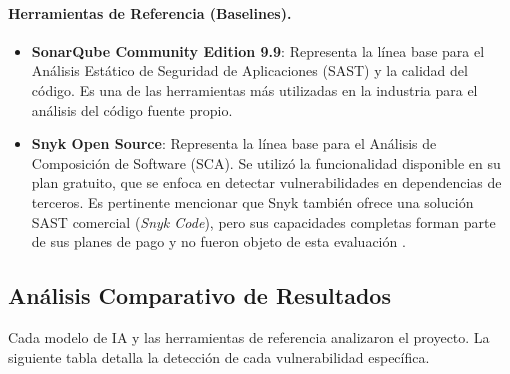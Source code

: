 \paragraph{Herramientas de Referencia (Baselines).}
\begin{itemize}
\item \textbf{SonarQube Community Edition 9.9}: Representa la línea base para el Análisis Estático de Seguridad de
Aplicaciones (SAST) y la calidad del código. Es una de las herramientas más utilizadas en la industria para el análisis del código fuente propio.
\item \textbf{Snyk Open Source}: Representa la línea base para el Análisis de Composición de Software (SCA). Se utilizó la funcionalidad disponible en su plan gratuito, que se enfoca en detectar vulnerabilidades en dependencias de terceros. Es pertinente mencionar que Snyk también ofrece una solución SAST comercial (\textit{Snyk Code}), pero sus capacidades completas forman parte de sus planes de pago y no fueron objeto de esta evaluación \cite{snyk_plans}.
\end{itemize}

\subsection{Análisis Comparativo de Resultados}
\label{subsec:analisis_comparativo_resultados}
Cada modelo de IA y las herramientas de referencia analizaron el proyecto. La siguiente tabla detalla la detección de cada vulnerabilidad específica.

\newcommand{\cmark}{{\color{green!80!black}\checkmark}}%
\newcommand{\xmark}{{\color{red!80!black}\ding{55}}}%

